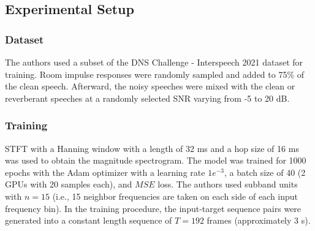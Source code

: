 \subsection{Experimental Setup}
\subsubsection{Dataset}
The authors used a subset of the DNS Challenge - Interspeech 2021 dataset for training. Room impulse responses were randomly sampled and added to 75\% of the clean speech.
Afterward, the noisy speeches were mixed with the clean or reverberant speeches at a randomly selected SNR varying from -5 to 20 dB.

\subsubsection{Training}
STFT with a Hanning window with a length of 32 ms and a hop size of 16 ms was used to obtain the magnitude spectrogram.
The model was trained for 1000 epochs with the Adam optimizer with a learning rate $1e^{-3}$, a batch size of 40 (2 GPUs with 20 samples each), and $MSE$ loss.
The authors used subband units with $n = 15$ (i.e., 15 neighbor frequencies are taken on each side of each input frequency bin).
In the training procedure, the input-target sequence pairs were generated into a constant length sequence of $T = 192$ frames (approximately 3 s).




